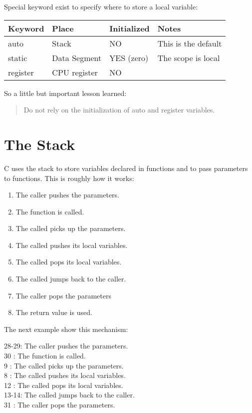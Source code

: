 \documentclass{report}
\begin{document}
Special keyword exist to specify where to store a local variable:
\newline

\begin{tabular}{|l|l|l|l|}
\hline
Keyword   & Place         & Initialized  & Notes\\
\hline
auto      & Stack         & NO           & This is the default\\
\hline
static    & Data Segment  & YES (zero)   & The scope is local\\
\hline 
register  & CPU register  & NO           &\\
\hline
\end{tabular}
\newline

So a little but important lesson learned:
\begin{quote}
Do not rely on the initialization of auto and register variables.
\end{quote}

\section{The Stack}
C uses the stack to store variables declared in functions and to pass parameters to functions.
This is roughly how it works:
\begin{enumerate}
\item The caller pushes the parameters.
\item The function is called.
\item The called picks up the parameters.
\item The called pushes its local variables.
\item The called pops its local variables.
\item The called jumps back to the caller.
\item The caller pops the parameters
\item The return value is used.
\end{enumerate}

The next example show this mechanism:

\begin{minipage}[t]{7cm}


\small
28-29: The caller pushes the parameters.\\
30   : The function is called.\\
9    : The called picks up the parameters.\\
8    : The called pushes its local variables.\\
12   : The called pops its local variables.\\
13-14: The called jumps back to the caller.\\
31   : The caller pops the parameters.

\end{minipage}
\begin{minipage}[t]{7cm}

\end{minipage}
\end{document}
